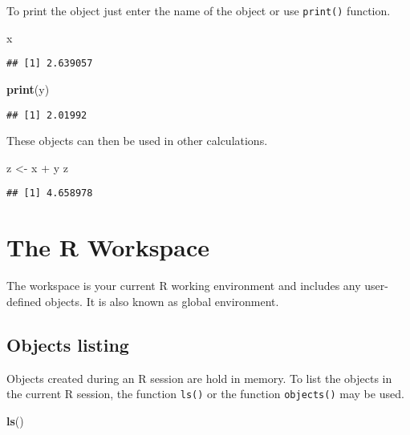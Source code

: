 \documentclass[]{book}
\newenvironment{Shaded}{\begin{snugshade}}{\end{snugshade}}
\newcommand{\KeywordTok}[1]{\textcolor[rgb]{0.13,0.29,0.53}{\textbf{{#1}}}}
\newcommand{\StringTok}[1]{\textcolor[rgb]{0.31,0.60,0.02}{{#1}}}
\newcommand{\NormalTok}[1]{{#1}}
\begin{document}
To print the object just enter the name of the object or use
\texttt{print()} function.

\begin{Shaded}
\begin{Highlighting}[]
\NormalTok{x}
\end{Highlighting}
\end{Shaded}

\begin{verbatim}
## [1] 2.639057
\end{verbatim}

\begin{Shaded}
\begin{Highlighting}[]
\KeywordTok{print}\NormalTok{(y)}
\end{Highlighting}
\end{Shaded}

\begin{verbatim}
## [1] 2.01992
\end{verbatim}

These objects can then be used in other calculations.

\begin{Shaded}
\begin{Highlighting}[]
\NormalTok{z <-}\StringTok{ }\NormalTok{x +}\StringTok{ }\NormalTok{y}
\NormalTok{z}
\end{Highlighting}
\end{Shaded}

\begin{verbatim}
## [1] 4.658978
\end{verbatim}

\section{The R Workspace}\label{the-r-workspace}

The workspace is your current R working environment and includes any
user-defined objects. It is also known as global environment.

\subsection{Objects listing}\label{objects-listing}

Objects created during an R session are hold in memory. To list the
objects in the current R session, the function \texttt{ls()} or the
function \texttt{objects()} may be used.

\begin{Shaded}
\begin{Highlighting}[]
\KeywordTok{ls}\NormalTok{()}
\end{Highlighting}
\end{Shaded}
\end{document}
